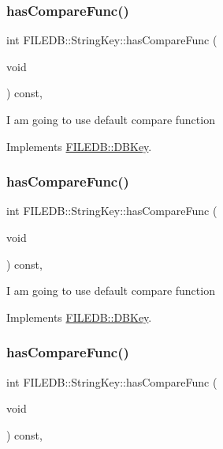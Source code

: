 \subsubsection{\texorpdfstring{hasCompareFunc()}{hasCompareFunc()}\hspace{0.1cm}{\footnotesize\ttfamily [1/3]}}
{\footnotesize\ttfamily int F\+I\+L\+E\+D\+B\+::\+String\+Key\+::has\+Compare\+Func (\begin{DoxyParamCaption}\item[{void}]{ }\end{DoxyParamCaption}) const\hspace{0.3cm}{\ttfamily [inline]}, {\ttfamily [virtual]}}

I am going to use default compare function 

Implements \mbox{\hyperlink{classFILEDB_1_1DBKey_a416c32ba10caf76e6b7ff4986cfc3c05}{F\+I\+L\+E\+D\+B\+::\+D\+B\+Key}}.

\mbox{\label{classFILEDB_1_1StringKey_a430c4d6d22db7160c501c1703f9f13cf}} 
\subsubsection{\texorpdfstring{hasCompareFunc()}{hasCompareFunc()}\hspace{0.1cm}{\footnotesize\ttfamily [2/3]}}
{\footnotesize\ttfamily int F\+I\+L\+E\+D\+B\+::\+String\+Key\+::has\+Compare\+Func (\begin{DoxyParamCaption}\item[{void}]{ }\end{DoxyParamCaption}) const\hspace{0.3cm}{\ttfamily [inline]}, {\ttfamily [virtual]}}

I am going to use default compare function 

Implements \mbox{\hyperlink{classFILEDB_1_1DBKey_a416c32ba10caf76e6b7ff4986cfc3c05}{F\+I\+L\+E\+D\+B\+::\+D\+B\+Key}}.

\mbox{\label{classFILEDB_1_1StringKey_a430c4d6d22db7160c501c1703f9f13cf}} 
\subsubsection{\texorpdfstring{hasCompareFunc()}{hasCompareFunc()}\hspace{0.1cm}{\footnotesize\ttfamily [3/3]}}
{\footnotesize\ttfamily int F\+I\+L\+E\+D\+B\+::\+String\+Key\+::has\+Compare\+Func (\begin{DoxyParamCaption}\item[{void}]{ }\end{DoxyParamCaption}) const\hspace{0.3cm}{\ttfamily [inline]}, {\ttfamily [virtual]}}


